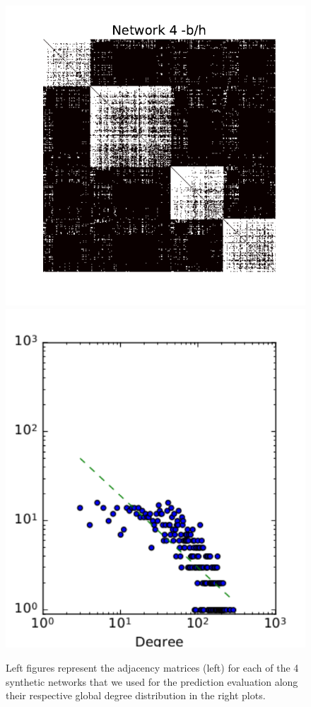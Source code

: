 \begin{figure}[h]
	\endminipage
	\vspace{-0.4cm}
	\includegraphics[scale=0.32]{img/g4}
	\endminipage
	\includegraphics[scale=0.32]{img/g4_d}
	\endminipage
	
	\caption{Left figures represent the adjacency matrices (left) for each of the 4 synthetic networks that we used for the prediction evaluation along their respective global degree distribution in the right plots.}
	\label{fig:synt_graph}
\end{figure}

\vspace{1cm}

